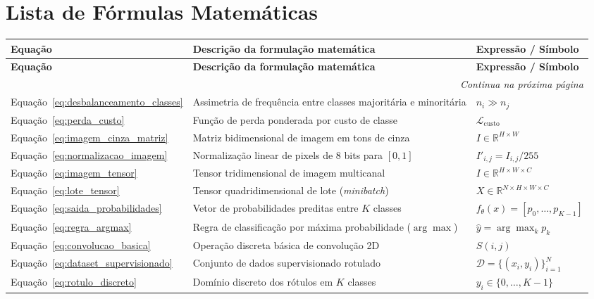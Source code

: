 \documentclass[
    12pt,
    openright,
    oneside,
    a4paper,
    english,
    brazil
]{abntex2}
\begin{document}
\chapter*{Lista de Fórmulas Matemáticas}
\begin{longtable}{@{}p{2.9cm}p{7.8cm}p{\dimexpr\textwidth-10.7cm-4\tabcolsep\relax}@{}}
\toprule
\textbf{Equação} & \textbf{Descrição da formulação matemática} & \textbf{Expressão / Símbolo} \\
\midrule
\endfirsthead
\toprule
\textbf{Equação} & \textbf{Descrição da formulação matemática} & \textbf{Expressão / Símbolo} \\
\midrule
\endhead
\midrule
\multicolumn{3}{r}{\footnotesize\textit{Continua na próxima página}} \\
\bottomrule
\endfoot
\bottomrule
\endlastfoot
Equação~\eqref{eq:desbalanceamento_classes} & Assimetria de frequência entre classes majoritária e minoritária & \(n_i \gg n_j\) \\
Equação~\eqref{eq:perda_custo} & Função de perda ponderada por custo de classe & \(\mathcal{L}_{\text{custo}}\) \\
Equação~\eqref{eq:imagem_cinza_matriz} & Matriz bidimensional de imagem em tons de cinza & \(I \in \mathbb{R}^{H \times W}\) \\
Equação~\eqref{eq:normalizacao_imagem} & Normalização linear de pixels de 8 bits para \([0,1]\) & \(I'_{i,j} = I_{i,j}/255\) \\
Equação~\eqref{eq:imagem_tensor} & Tensor tridimensional de imagem multicanal & \(I \in \mathbb{R}^{H \times W \times C}\) \\
Equação~\eqref{eq:lote_tensor} & Tensor quadridimensional de lote (\textit{minibatch}) & \(X \in \mathbb{R}^{N \times H \times W \times C}\) \\
Equação~\eqref{eq:saida_probabilidades} & Vetor de probabilidades preditas entre \(K\) classes & \(f_\theta(x) = [p_0,\dots,p_{K-1}]\) \\
Equação~\eqref{eq:regra_argmax} & Regra de classificação por máxima probabilidade (\(\arg\max\)) & \(\hat{y} = \arg\max_k p_k\) \\
Equação~\eqref{eq:convolucao_basica} & Operação discreta básica de convolução 2D & \(S(i,j)\) \\
Equação~\eqref{eq:dataset_supervisionado} & Conjunto de dados supervisionado rotulado & \(\mathcal{D} = \{(x_i, y_i)\}_{i=1}^{N}\) \\
Equação~\eqref{eq:rotulo_discreto} & Domínio discreto dos rótulos em \(K\) classes & \(y_i \in \{0,\dots,K-1\}\) \\

\end{longtable}
\end{document}
